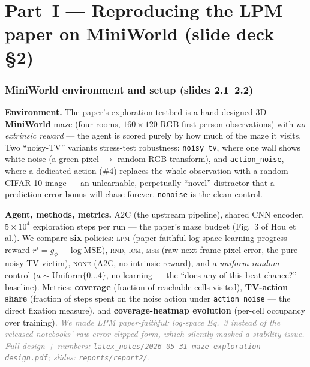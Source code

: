 \documentclass[11pt]{article}
\newcommand{\note}[1]{\textcolor{gray}{\small\emph{#1}}}
\begin{document}
\part*{Part~I --- Reproducing the LPM paper on MiniWorld (slide deck \S2)}

\section{MiniWorld environment and setup (slides 2.1--2.2)}\label{sec:mwsetup}
\textbf{Environment.} The paper's exploration testbed is a hand-designed 3D \textbf{MiniWorld} maze
(four rooms, $160\times120$ RGB first-person observations) with \emph{no extrinsic reward} --- the
agent is scored purely by how much of the maze it visits. Two ``noisy-TV'' variants stress-test
robustness: \texttt{noisy\_tv}, where one wall shows white noise (a green-pixel $\to$ random-RGB
transform), and \texttt{action\_noise}, where a dedicated action (\#4) replaces the whole observation
with a random CIFAR-10 image --- an unlearnable, perpetually ``novel'' distractor that a
prediction-error bonus will chase forever. \texttt{nonoise} is the clean control.

\textbf{Agent, methods, metrics.} A2C (the upstream pipeline), shared CNN encoder, $5\!\times\!10^4$
exploration steps per run --- the paper's maze budget (Fig.~3 of Hou et al.). We compare \textbf{six}
policies: \textsc{lpm} (paper-faithful log-space learning-progress reward
$r^i=g_\phi-\log\mathrm{MSE}$), \textsc{rnd}, \textsc{icm}, \textsc{mse} (raw next-frame pixel error,
the pure noisy-TV victim), \textsc{none} (A2C, no intrinsic reward), and a \emph{uniform-random}
control ($a\sim\mathrm{Uniform}\{0\dots4\}$, no learning --- the ``does any of this beat chance?''
baseline). Metrics: \textbf{coverage} (fraction of reachable cells visited), \textbf{TV-action share}
(fraction of steps spent on the noise action under \texttt{action\_noise} --- the direct fixation
measure), and \textbf{coverage-heatmap evolution} (per-cell occupancy over training).
\note{We made LPM paper-faithful: log-space Eq.~3 instead of the released notebooks' raw-error clipped
form, which silently masked a stability issue. Full design + numbers:
\texttt{latex\_notes/2026-05-31-maze-exploration-design.pdf}; slides: \texttt{reports/report2/}.}
\end{document}
